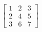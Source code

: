\documentclass[preview]{standalone}
\begin{document}
\begin{align*}
\begin{bmatrix} 1 & 2 & 3 \\ 2 & 4 & 5 \\ 3 & 6 & 7 \end{bmatrix}
\end{align*}
\end{document}
